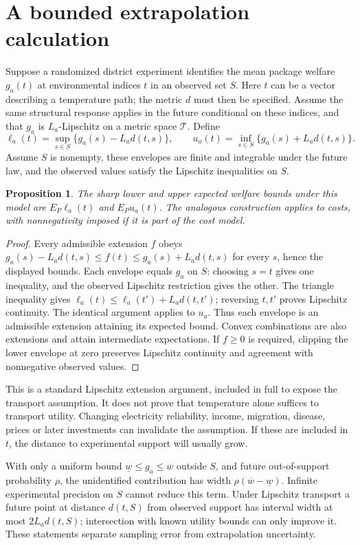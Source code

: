 \documentclass[11pt,a4paper]{article}
\newtheorem{proposition}[theorem]{Proposition}
\begin{document}
\section{A bounded extrapolation calculation}
Suppose a randomized district experiment identifies the mean package welfare $g_a(t)$ at environmental indices $t$ in an observed set $S$. Here $t$ can be a vector describing a temperature path; the metric $d$ must then be specified. Assume the same structural response applies in the future conditional on these indices, and that $g_a$ is $L_a$-Lipschitz on a metric space $\mathcal T$. Define
\[
 \ell_a(t)=\sup_{s\in S}\{g_a(s)-L_ad(t,s)\},\qquad
 u_a(t)=\inf_{s\in S}\{g_a(s)+L_ad(t,s)\}.
\]
Assume $S$ is nonempty, these envelopes are finite and integrable under the future law, and the observed values satisfy the Lipschitz inequalities on $S$.
\begin{proposition}
The sharp lower and upper expected welfare bounds under this model are
$E_P\ell_a(t)$ and $E_Pu_a(t)$. The analogous construction applies to costs, with nonnegativity imposed if it is part of the cost model.
\end{proposition}
\begin{proof}
Every admissible extension $f$ obeys $g_a(s)-L_ad(t,s)\le f(t)\le g_a(s)+L_ad(t,s)$ for every $s$, hence the displayed bounds. Each envelope equals $g_a$ on $S$: choosing $s=t$ gives one inequality, and the observed Lipschitz restriction gives the other. The triangle inequality gives
$\ell_a(t)\le\ell_a(t')+L_ad(t,t')$; reversing $t,t'$ proves Lipschitz continuity. The identical argument applies to $u_a$. Thus each envelope is an admissible extension attaining its expected bound. Convex combinations are also extensions and attain intermediate expectations. If $f\ge0$ is required, clipping the lower envelope at zero preserves Lipschitz continuity and agreement with nonnegative observed values.
\end{proof}
This is a standard Lipschitz extension argument, included in full to expose the transport assumption. It does not prove that temperature alone suffices to transport utility. Changing electricity reliability, income, migration, disease, prices or later investments can invalidate the assumption. If these are included in $t$, the distance to experimental support will usually grow.

With only a uniform bound $\underline w\le g_a\le\overline w$ outside $S$, and future out-of-support probability $\rho$, the unidentified contribution has width $\rho(\overline w-\underline w)$. Infinite experimental precision on $S$ cannot reduce this term. Under Lipschitz transport a future point at distance $d(t,S)$ from observed support has interval width at most $2L_ad(t,S)$; intersection with known utility bounds can only improve it. These statements separate sampling error from extrapolation uncertainty.
\end{document}
